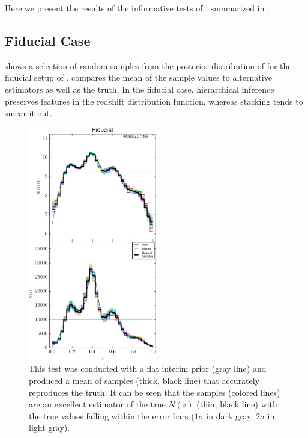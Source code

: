 Here we present the results of the informative tests of , summarized in .  

\subsection{Fiducial Case}

 shows a selection of random samples from the posterior distribution of  for the fiducial setup of .  
 compares the mean of the sample values to alternative estimators as well as the truth.  
In the fiducial case, hierarchical inference preserves features in the redshift distribution function, whereas stacking tends to smear it out.  

\begin{figure}
	\includegraphics[width=0.5\textwidth]{figures/chippr/null_samps.pdf}
	\caption{This test was conducted with a flat interim prior (gray line) and produced a mean of samples (thick, black line) that accurately reproduces the truth.  
		It can be seen that the samples (colored lines) are an excellent estimator of the true $N(z)$ (thin, black line) with the true values falling within the error bars ($1\sigma$ in dark gray, $2\sigma$ in light gray).}
	\label{fig:null-samp}
\end{figure}

